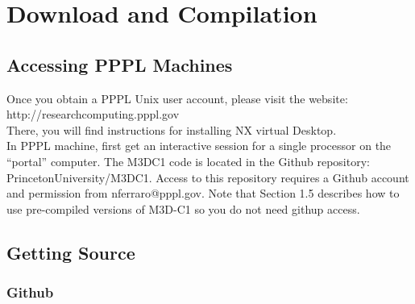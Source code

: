\section{Download and Compilation}

\subsection{Accessing PPPL Machines}

Once you obtain a PPPL Unix user account, please visit the website:   http://researchcomputing.pppl.gov
\\
There, you will find instructions for installing NX virtual Desktop.
\\
In PPPL machine, first get an interactive session for a single processor on the “portal” computer.    The M3DC1 code is located in the Github repository: PrincetonUniversity/M3DC1. Access to this repository requires a Github account and permission from nferraro@pppl.gov.   Note that Section 1.5 describes how to use pre-compiled versions of M3D-C1 so you do not need githup access.

\subsection{Getting Source}
\subsubsection{Github}

